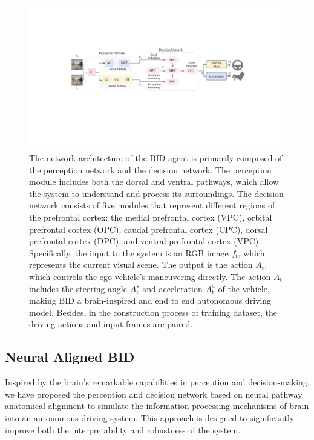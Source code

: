 \begin{figure}[t]
	\centering
	\includegraphics[width=\linewidth]{fig/net.pdf}
	\caption{The network architecture of the BID agent is primarily composed of the perception network and the decision network.
	The perception module includes both the dorsal and ventral pathways, which allow the system to understand and process its surroundings.
	The decision network consists of five modules that represent different regions of the prefrontal cortex: the medial prefrontal cortex (VPC), orbital prefrontal cortex (OPC), caudal prefrontal cortex (CPC), dorsal prefrontal cortex (DPC), and ventral prefrontal cortex (VPC). 
	Specifically, the input to the system is an RGB image $f_{t} $, which represents the current visual scene.
	The output is the action $A_\text{t}$, which controls the ego-vehicle's maneuvering directly.
	The action $A_\text{t}$ includes the steering angle $ A_\text{t}^s $ and acceleration $ A_\text{t}^a $ of the vehicle, making BID a brain-inspired and end to end autonomous driving model.
	Besides, in the construction process of training dataset, the driving actions and input frames are paired.
	}
	\label{fig:fig2}
\end{figure}


\subsection{Neural Aligned BID}
\hspace{1pc}Inspired by the brain's remarkable capabilities in perception and decision-making, we have proposed the perception and decision network based on neural pathway anatomical alignment to simulate the information processing mechanisms of brain into an autonomous driving system. 
This approach is designed to significantly improve both the interpretability and robustness of the system.

